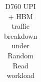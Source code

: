 \begin{table}[t]
\begin{tabular}{|l|cc|cc|cc||cc|cc|cc|}
\end{tabular}

\caption{D760 UPI + HBM traffic breakdown under Random Read workload}
\label{tab:upi-hbm-traffic}
\end{table}
